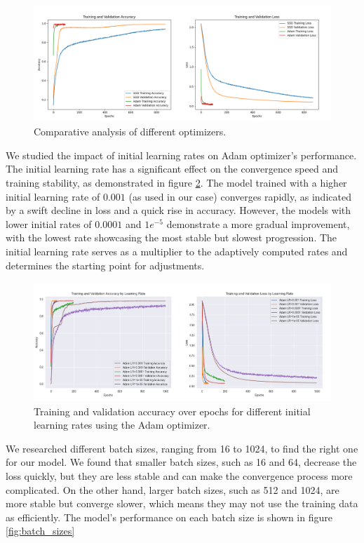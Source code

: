 \begin{figure}[ht!]
	\centering
	\includegraphics[width=\textwidth]{images/optimizers_comparison.png}
	\caption{Comparative analysis of different optimizers.}
	\label{fig:optimizers}
\end{figure}


We studied the impact of initial learning rates on Adam optimizer's performance. The initial learning rate has a significant effect on the convergence speed and training stability, as demonstrated in figure \ref{fig:learning_rates}.\newline
The model trained with a higher initial learning rate of $0.001$ (as used in our case) converges rapidly, as indicated by a swift decline in loss and a quick rise in accuracy. However, the models with lower initial rates of $0.0001$ and $1e^{-5}$ demonstrate a more gradual improvement, with the lowest rate showcasing the most stable but slowest progression.\newline
The initial learning rate serves as a multiplier to the adaptively computed rates and determines the starting point for adjustments.
\begin{figure}[ht!]
	\centering
	\includegraphics[width=\textwidth]{images/adam_learning_rates_comparison.png}
	\caption{Training and validation accuracy over epochs for different initial learning rates using the Adam optimizer.}
	\label{fig:learning_rates}
\end{figure}

We researched different batch sizes, ranging from 16 to 1024, to find the right one for our model. We found that smaller batch sizes, such as 16 and 64, decrease the loss quickly, but they are less stable and can make the convergence process more complicated. On the other hand, larger batch sizes, such as 512 and 1024, are more stable but converge slower, which means they may not use the training data as efficiently. The model's performance on each batch size is shown in figure \ref{fig:batch_sizes}

